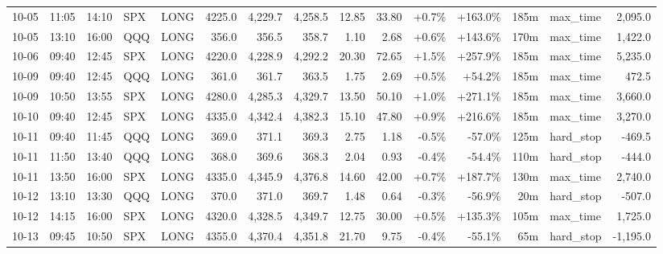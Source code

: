 \documentclass[11pt,a4paper,twoside]{article}
\begin{document}
\begin{landscape}
\begin{center}
\begin{longtable}{>{\color{txtmain}}l l l l l r r r r r r r r >{\color{txtmain}}l r}
10-05 & 11:05 & 14:10 & SPX & LONG & 4225.0 & 4,229.7 & 4,258.5 & 12.85 & 33.80 & \textcolor{wingreen}{+0.7\%} & \textcolor{wingreen}{+163.0\%} & 185m & max\_time & \textcolor{wingreen}{2,095.0} \\
10-05 & 13:10 & 16:00 & QQQ & LONG & 356.0 & 356.5 & 358.7 & 1.10 & 2.68 & \textcolor{wingreen}{+0.6\%} & \textcolor{wingreen}{+143.6\%} & 170m & max\_time & \textcolor{wingreen}{1,422.0} \\
10-06 & 09:40 & 12:45 & SPX & LONG & 4220.0 & 4,228.9 & 4,292.2 & 20.30 & 72.65 & \textcolor{wingreen}{+1.5\%} & \textcolor{wingreen}{+257.9\%} & 185m & max\_time & \textcolor{wingreen}{5,235.0} \\
10-09 & 09:40 & 12:45 & QQQ & LONG & 361.0 & 361.7 & 363.5 & 1.75 & 2.69 & \textcolor{wingreen}{+0.5\%} & \textcolor{wingreen}{+54.2\%} & 185m & max\_time & \textcolor{wingreen}{472.5} \\
10-09 & 10:50 & 13:55 & SPX & LONG & 4280.0 & 4,285.3 & 4,329.7 & 13.50 & 50.10 & \textcolor{wingreen}{+1.0\%} & \textcolor{wingreen}{+271.1\%} & 185m & max\_time & \textcolor{wingreen}{3,660.0} \\
10-10 & 09:40 & 12:45 & SPX & LONG & 4335.0 & 4,342.4 & 4,382.3 & 15.10 & 47.80 & \textcolor{wingreen}{+0.9\%} & \textcolor{wingreen}{+216.6\%} & 185m & max\_time & \textcolor{wingreen}{3,270.0} \\
10-11 & 09:40 & 11:45 & QQQ & LONG & 369.0 & 371.1 & 369.3 & 2.75 & 1.18 & \textcolor{lossred}{-0.5\%} & \textcolor{lossred}{-57.0\%} & 125m & hard\_stop & \textcolor{lossred}{-469.5} \\
10-11 & 11:50 & 13:40 & QQQ & LONG & 368.0 & 369.6 & 368.3 & 2.04 & 0.93 & \textcolor{lossred}{-0.4\%} & \textcolor{lossred}{-54.4\%} & 110m & hard\_stop & \textcolor{lossred}{-444.0} \\
10-11 & 13:50 & 16:00 & SPX & LONG & 4335.0 & 4,345.9 & 4,376.8 & 14.60 & 42.00 & \textcolor{wingreen}{+0.7\%} & \textcolor{wingreen}{+187.7\%} & 130m & max\_time & \textcolor{wingreen}{2,740.0} \\
10-12 & 13:10 & 13:30 & QQQ & LONG & 370.0 & 371.0 & 369.7 & 1.48 & 0.64 & \textcolor{lossred}{-0.3\%} & \textcolor{lossred}{-56.9\%} & 20m & hard\_stop & \textcolor{lossred}{-507.0} \\
10-12 & 14:15 & 16:00 & SPX & LONG & 4320.0 & 4,328.5 & 4,349.7 & 12.75 & 30.00 & \textcolor{wingreen}{+0.5\%} & \textcolor{wingreen}{+135.3\%} & 105m & max\_time & \textcolor{wingreen}{1,725.0} \\
10-13 & 09:45 & 10:50 & SPX & LONG & 4355.0 & 4,370.4 & 4,351.8 & 21.70 & 9.75 & \textcolor{lossred}{-0.4\%} & \textcolor{lossred}{-55.1\%} & 65m & hard\_stop & \textcolor{lossred}{-1,195.0} \\

\end{longtable}
\end{center}
\end{landscape}
\end{document}
